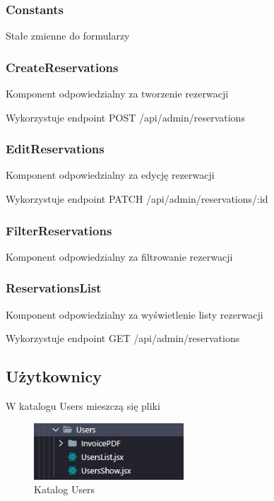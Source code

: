 \documentclass[titlepage]{article}
\begin{document}
\subsubsection{Constants}
Stałe zmienne do formularzy

\subsubsection{CreateReservations}
Komponent odpowiedzialny za tworzenie rezerwacji

\newline
Wykorzystuje endpoint POST /api/admin/reservations

\subsubsection{EditReservations}
Komponent odpowiedzialny za edycję rezerwacji

\newline
Wykorzystuje endpoint PATCH /api/admin/reservations/:id

\subsubsection{FilterReservations}
Komponent odpowiedzialny za filtrowanie rezerwacji

\subsubsection{ReservationsList}
Komponent odpowiedzialny za wyświetlenie listy rezerwacji

\newline
Wykorzystuje endpoint GET /api/admin/reservations

\subsection{Użytkownicy}
W katalogu Users mieszczą się pliki

\begin{figure}[h]
\centering
\includegraphics[width=0.5\textwidth]{users-admin.png}

\caption{Katalog Users}
\label{fig:obrazek Users}
\end{figure}
\end{document}
